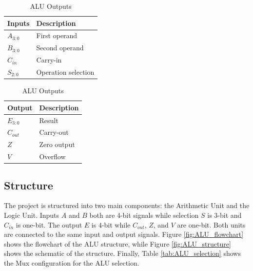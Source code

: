 \documentclass{article}
\begin{document}
\begin{table}[H]
  \begin{minipage}{.5\linewidth}
    \centering
    \caption{ALU Inputs}
    \begin{tabular}{l|l}
      \hline
      \textbf{Inputs} & \textbf{Description} \\
      \hline
      $A_{3:0}$ & First operand \\
      $B_{3:0}$ & Second operand \\
      $C_{in}$ & Carry-in \\
      $S_{2:0}$ & Operation selection \\
      \hline
    \end{tabular}
  \end{minipage}%
  \begin{minipage}{.5\linewidth}
    \centering
    \caption{ALU Outputs}
    \begin{tabular}{l|l}
      \hline
      \textbf{Output} & \textbf{Description} \\
      \hline
      $E_{3:0}$ & Result \\
      $C_{out}$ & Carry-out \\
      $Z$ & Zero output \\
      $V$ & Overflow \\
      \hline
    \end{tabular}
  \end{minipage}
\end{table}

\subsection{Structure}

The project is structured into two main components: the Arithmetic Unit and the
Logic Unit. Inputs \(A\) and \(B\) both are 4-bit signals while selection \(S\)
is 3-bit and \(C_{in}\) is one-bit. The output \(E\) is 4-bit while \(C_{out}\),
\(Z\), and \(V\) are one-bit. Both units are connected to the same input and
output signals. Figure \ref{fig:ALU_flowchart} shows the flowchart of the ALU
structure, while Figure \ref{fig:ALU_structure} shows the schematic of the
structure. Finally, Table \ref{tab:ALU_selection} shows the Mux configuration
for the ALU selection.
\end{document}
